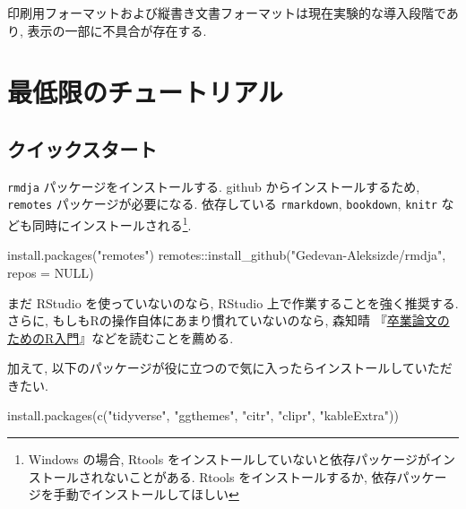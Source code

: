 \documentclass[
]{bxjsbook}
\newenvironment{Shaded}{\begin{snugshade}}{\end{snugshade}}
\newcommand{\AttributeTok}[1]{\textcolor[rgb]{0.77,0.63,0.00}{#1}}
\newcommand{\ConstantTok}[1]{\textcolor[rgb]{0.00,0.00,0.00}{#1}}
\newcommand{\FunctionTok}[1]{\textcolor[rgb]{0.00,0.00,0.00}{#1}}
\newcommand{\NormalTok}[1]{#1}
\newcommand{\SpecialCharTok}[1]{\textcolor[rgb]{0.00,0.00,0.00}{#1}}
\newcommand{\StringTok}[1]{\textcolor[rgb]{0.31,0.60,0.02}{#1}}
\newenvironment{infobox}[1]{\begin{itemize}\renewcommand{\labelitemi}{\raisebox{-.7\height}[0pt][0pt]{%
  {\setkeys{Gin}{width=3em,keepaspectratio}\texttt{[image: \_latex/\_img/\#1]}}}}
  \setlength{\fboxsep}{1em}
  \begin{greyblock}
  \item
  }{\end{greyblock}\end{itemize}
}
\newenvironment{important}{\begin{infobox}{important}}{\end{infobox}}
\theoremstyle{definition}
\theoremstyle{definition}
\theoremstyle{definition}
\theoremstyle{remark}
\begin{document}
\begin{important}
印刷用フォーマットおよび縦書き文書フォーマットは現在実験的な導入段階であり,
表示の一部に不具合が存在する.
\end{important}

\hypertarget{part-ux6700ux4f4eux9650ux306eux30c1ux30e5ux30fcux30c8ux30eaux30a2ux30eb}{%
\part{
最低限のチュートリアル}\label{part-ux6700ux4f4eux9650ux306eux30c1ux30e5ux30fcux30c8ux30eaux30a2ux30eb}}

\hypertarget{quick-start}{%
\chapter{クイックスタート}\label{quick-start}}

\texttt{rmdja} パッケージをインストールする. github
からインストールするため, \texttt{remotes} パッケージが必要になる.
依存している \texttt{rmarkdown}, \texttt{bookdown}, \texttt{knitr}
なども同時にインストールされる\footnote{Windows の場合, Rtools
  をインストールしていないと依存パッケージがインストールされないことがある.
  Rtools をインストールするか,
  依存パッケージを手動でインストールしてほしい}.

\begin{Shaded}
\begin{Highlighting}[numbers=left,,]
\FunctionTok{install.packages}\NormalTok{(}\StringTok{"remotes"}\NormalTok{)}
\NormalTok{remotes}\SpecialCharTok{::}\FunctionTok{install\_github}\NormalTok{(}\StringTok{"Gedevan{-}Aleksizde/rmdja"}\NormalTok{, }\AttributeTok{repos =} \ConstantTok{NULL}\NormalTok{)}
\end{Highlighting}
\end{Shaded}

まだ RStudio を使っていないのなら, RStudio
上で作業することを強く推奨する. さらに,
もしもRの操作自体にあまり慣れていないのなら, 森知晴
『\href{https://tomoecon.github.io/R_for_graduate_thesis/}{卒業論文のためのR入門}』などを読むことを薦める.

加えて,
以下のパッケージが役に立つので気に入ったらインストールしていただきたい.

\begin{Shaded}
\begin{Highlighting}[numbers=left,,]
\FunctionTok{install.packages}\NormalTok{(}\FunctionTok{c}\NormalTok{(}\StringTok{"tidyverse"}\NormalTok{, }\StringTok{"ggthemes"}\NormalTok{, }\StringTok{"citr"}\NormalTok{, }\StringTok{"clipr"}\NormalTok{, }\StringTok{"kableExtra"}\NormalTok{))}
\end{Highlighting}
\end{Shaded}
\end{document}
